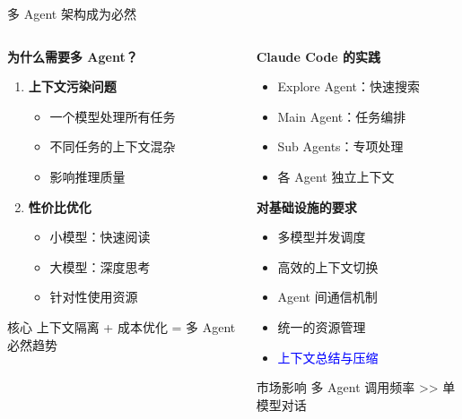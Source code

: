 \documentclass[aspectratio=169,xcolor=dvipsnames]{beamer}
\begin{document}
\begin{frame}{多 Agent 架构成为必然}
  \begin{columns}
    \begin{column}{0.48\textwidth}
      \textbf{为什么需要多 Agent？}
      \begin{enumerate}
        \item \textbf{上下文污染问题}
        \begin{itemize}
          \item 一个模型处理所有任务
          \item 不同任务的上下文混杂
          \item 影响推理质量
        \end{itemize}

        \item \textbf{性价比优化}
        \begin{itemize}
          \item 小模型：快速阅读
          \item 大模型：深度思考
          \item 针对性使用资源
        \end{itemize}
      \end{enumerate}

      \vspace{0.3cm}

      \begin{alertblock}{核心}
        上下文隔离 + 成本优化 = 多 Agent 必然趋势
      \end{alertblock}
    \end{column}
    \begin{column}{0.48\textwidth}
      \textbf{Claude Code 的实践}
      \begin{itemize}
        \item Explore Agent：快速搜索
        \item Main Agent：任务编排
        \item Sub Agents：专项处理
        \item 各 Agent 独立上下文
      \end{itemize}

      \vspace{0.3cm}

      \textbf{对基础设施的要求}
      \begin{itemize}
        \item 多模型并发调度
        \item 高效的上下文切换
        \item Agent 间通信机制
        \item 统一的资源管理
        \item \textcolor{blue}{上下文总结与压缩}
      \end{itemize}

      \vspace{0.2cm}

      \begin{exampleblock}{市场影响}
        多 Agent 调用频率 >> 单模型对话
      \end{exampleblock}
    \end{column}
  \end{columns}
\end{frame}
\end{document}
